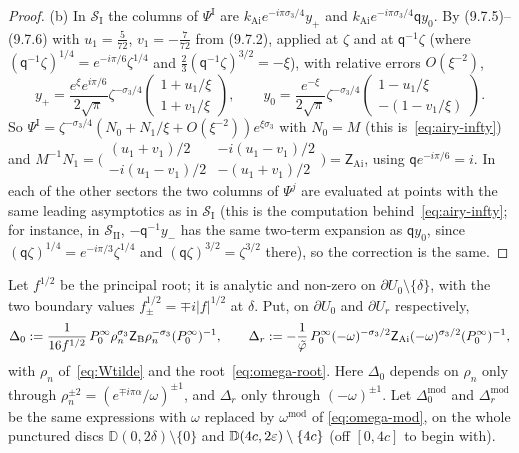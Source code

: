 \begin{proof}
(b) In $\mathcal S_{\mathrm I}$ the columns of $\Psi^{\mathrm I}$ are $k_{\mathrm{Ai}}e^{-i\pi\sigma_3/4}y_+$ and
$k_{\mathrm{Ai}}e^{-i\pi\sigma_3/4}\mathsf qy_0$. By (9.7.5)--(9.7.6) with $u_1=\frac5{72}$, $v_1=-\frac7{72}$ from (9.7.2), applied
at $\zeta$ and at $\mathsf q^{-1}\zeta$ (where $(\mathsf q^{-1}\zeta)^{1/4}=e^{-i\pi/6}\zeta^{1/4}$ and
$\frac23(\mathsf q^{-1}\zeta)^{3/2}=-\xi$), with relative errors $O(\xi^{-2})$,
\[
  y_+=\frac{e^\xi e^{i\pi/6}}{2\sqrt\pi}\zeta^{-\sigma_3/4}\begin{pmatrix}1+u_1/\xi\\1+v_1/\xi\end{pmatrix},\qquad
  y_0=\frac{e^{-\xi}}{2\sqrt\pi}\zeta^{-\sigma_3/4}\begin{pmatrix}1-u_1/\xi\\-(1-v_1/\xi)\end{pmatrix}.
\]
So $\Psi^{\mathrm I}=\zeta^{-\sigma_3/4}(N_0+N_1/\xi+O(\xi^{-2}))e^{\xi\sigma_3}$ with $N_0=M$ (this is~\eqref{eq:airy-infty}) and
$M^{-1}N_1=\bigl(\begin{smallmatrix}(u_1+v_1)/2&-i(u_1-v_1)/2\\-i(u_1-v_1)/2&-(u_1+v_1)/2\end{smallmatrix}\bigr)=\mathsf Z_{\mathrm{Ai}}$,
using $\mathsf qe^{-i\pi/6}=i$. In each of the other sectors the two columns of $\Psi^j$ are evaluated at points with the
same leading asymptotics as in $\mathcal S_{\mathrm I}$ (this is the computation behind~\eqref{eq:airy-infty}; for
instance, in $\mathcal S_{\mathrm{II}}$, $-\mathsf q^{-1}y_-$ has the same two-term expansion as $\mathsf qy_0$, since
$(\mathsf q\zeta)^{1/4}=e^{-i\pi/3}\zeta^{1/4}$ and $(\mathsf q\zeta)^{3/2}=\zeta^{3/2}$ there), so the correction is the same.
\end{proof}

Let $f^{1/2}$ be the principal root; it is analytic and non-zero on $\partial U_0\setminus\{\delta\}$, with the two
boundary values $f^{1/2}_\pm=\mp i|f|^{1/2}$ at $\delta$. Put, on $\partial U_0$ and $\partial U_r$
respectively,
\begin{equation}\label{eq:Delta}
  \Delta_0:=\frac1{16f^{1/2}}\,P^\infty_0\rho_n^{\sigma_3}\mathsf Z_{\mathrm B}\rho_n^{-\sigma_3}(P^\infty_0)^{-1},\qquad
  \Delta_r:=-\frac1{\tilde\varphi}\,P^\infty_0(-\omega)^{-\sigma_3/2}\mathsf Z_{\mathrm{Ai}}(-\omega)^{\sigma_3/2}(P^\infty_0)^{-1},
\end{equation}
with $\rho_n$ of~\eqref{eq:Wtilde} and the root~\eqref{eq:omega-root}. Here $\Delta_0$ depends on $\rho_n$ only
through $\rho_n^{\pm2}=(e^{\mp i\pi\alpha}/\omega)^{\pm1}$, and $\Delta_r$ only through $(-\omega)^{\pm1}$. Let
$\Delta_0^{\mathrm{mod}}$ and $\Delta_r^{\mathrm{mod}}$ be the same expressions with $\omega$ replaced by $\omega^{\mathrm{mod}}$ of
\eqref{eq:omega-mod}, on the whole punctured discs $\mathbb D(0,2\delta)\setminus\{0\}$ and $\mathbb D(4c,2\varepsilon)\setminus\{4c\}$ (off
$[0,4c]$ to begin with).

